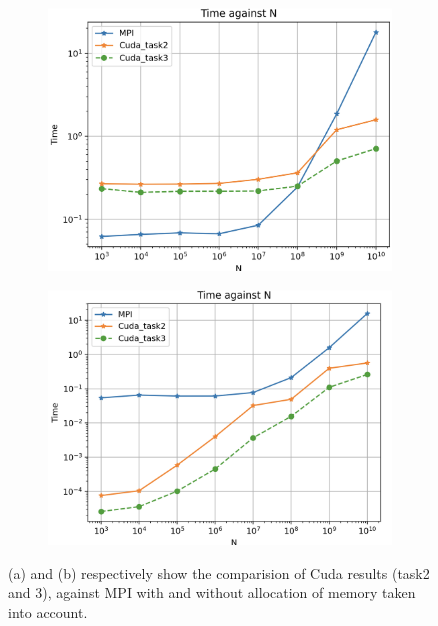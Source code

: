 \documentclass[12pt,a4paper]{article}
\begin{document}
\begin{figure}[H]
	\begin{subfigure}[b]{0.5\textwidth}
		\centering
		\includegraphics[width=1.0\linewidth]{"combined"}
		\caption{}
		\label{fig:combined}
	\end{subfigure}
	\begin{subfigure}[b]{0.5\textwidth}
		\centering
		\includegraphics[width=1.0\linewidth]{"t3nm_3"}
		\caption{}
		\label{fig:t3nm_3}
	\end{subfigure}
	\caption{(a) and (b) respectively show the comparision of Cuda results (task2 and 3),  against MPI  with and without allocation of memory taken into account.}
\end{figure}


	
	
	
\end{document}
